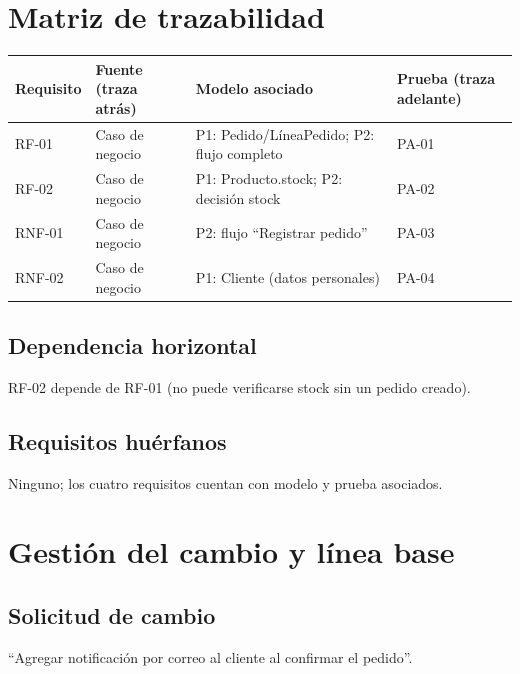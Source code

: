 \documentclass[11pt,a4paper]{article}
\begin{document}
\newpage

\section{Matriz de trazabilidad}

\begin{center}
\begin{tabular}{p{1.5cm}p{2.5cm}p{5cm}p{1.7cm}}
\toprule
\textbf{Requisito} & \textbf{Fuente (traza atrás)} & \textbf{Modelo asociado} & \textbf{Prueba (traza adelante)} \\
\midrule
RF-01  & Caso de negocio & P1: Pedido/LíneaPedido; P2: flujo completo   & PA-01 \\
RF-02  & Caso de negocio & P1: Producto.stock; P2: decisión stock       & PA-02 \\
RNF-01 & Caso de negocio & P2: flujo ``Registrar pedido''               & PA-03 \\
RNF-02 & Caso de negocio & P1: Cliente (datos personales)               & PA-04 \\
\bottomrule
\end{tabular}
\end{center}

\subsection*{Dependencia horizontal}
RF-02 depende de RF-01 (no puede verificarse stock sin un pedido creado).

\subsection*{Requisitos huérfanos}
Ninguno; los cuatro requisitos cuentan con modelo y prueba asociados.

\newpage

\section{Gestión del cambio y línea base}

\subsection*{Solicitud de cambio}
``Agregar notificación por correo al cliente al confirmar el pedido''.
\end{document}
